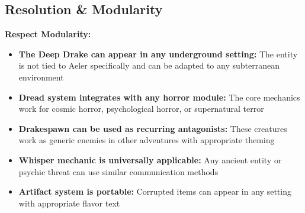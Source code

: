 \documentclass[11pt]{article}
\begin{document}
\begin{itemize}
\begin{itemize}
\begin{itemize}
\begin{itemize}
\section{Resolution & Modularity}

\textbf{Respect Modularity:} \begin{itemize} \item \textbf{The Deep Drake can appear in any underground setting:} The entity is not tied to Aeler specifically and can be adapted to any subterranean environment \item \textbf{Dread system integrates with any horror module:} The core mechanics work for cosmic horror, psychological horror, or supernatural terror \item \textbf{Drakespawn can be used as recurring antagonists:} These creatures work as generic enemies in other adventures with appropriate theming \item \textbf{Whisper mechanic is universally applicable:} Any ancient entity or psychic threat can use similar communication methods \item \textbf{Artifact system is portable:} Corrupted items can appear in any setting with appropriate flavor text \end{itemize}


\end{itemize}
\end{itemize}
\end{itemize}
\end{itemize}
\end{document}
